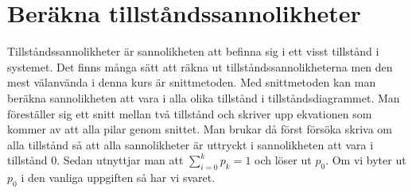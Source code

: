 \documentclass{article}
\begin{document}
	\section*{Beräkna tillståndssannolikheter}
	Tillståndssannolikheter är sannolikheten att befinna sig i ett visst tillstånd i systemet. Det finns många sätt att räkna ut tillståndssannolikheterna men den mest välanvända i denna kurs är snittmetoden. Med snittmetoden kan man beräkna sannolikheten att vara i alla olika tillstånd i tillståndsdiagrammet. Man föreställer sig ett snitt mellan två tillstånd och skriver upp ekvationen som kommer av att alla pilar genom snittet. Man brukar då först försöka skriva om alla tillstånd så att alla sannolikheter är uttryckt i sannolikheten att vara i tillstånd 0. Sedan utnyttjar man att $\sum_{i=0}^{k}p_k = 1$ och löser ut $p_0$. Om vi byter ut $p_0$ i den vanliga uppgiften så har vi svaret.
\end{document}
